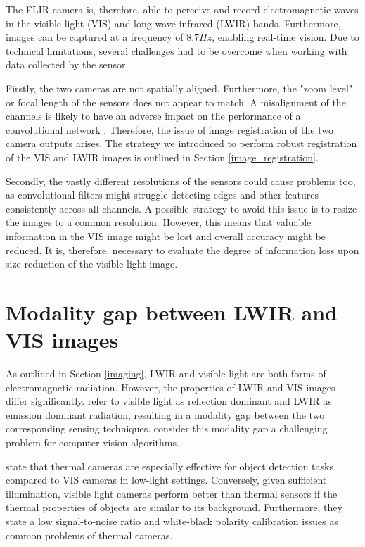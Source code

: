 \documentclass{l4proj}
\begin{document}
The FLIR camera is, therefore, able to perceive and record electromagnetic waves in the visible-light (VIS) and long-wave infrared (LWIR) bands. Furthermore, images can be captured at a frequency of $8.7 Hz$, enabling real-time vision. Due to technical limitations, several challenges had to be overcome when working with data collected by the sensor.

Firstly, the two cameras are not spatially aligned. Furthermore, the "zoom level" or focal length of the sensors does not appear to match. A misalignment of the channels is likely to have an adverse impact on the performance of a convolutional network \citep{chappelow_improving_2008}. Therefore, the issue of image registration of the two camera outputs arises. The strategy we introduced to perform robust registration of the VIS and LWIR images is outlined in Section \ref{image_registration}.

Secondly, the vastly different resolutions of the sensors could cause problems too, as convolutional filters might struggle detecting edges and other features consistently across all channels. A possible strategy to avoid this issue is to resize the images to a common resolution. However, this means that valuable information in the VIS image might be lost and overall accuracy might be reduced. It is, therefore, necessary to evaluate the degree of information loss upon size reduction of the visible light image.


\section{Modality gap between LWIR and VIS images}
\label{modality}

As outlined in Section \ref{imaging}, LWIR and visible light are both forms of electromagnetic radiation. However, the properties of LWIR and VIS images differ significantly. \citet{sarfraz_deep_2017} refer to visible light as reflection dominant and LWIR as emission dominant radiation, resulting in a modality gap between the two corresponding sensing techniques. \citet{choi_thermal_2012} consider this modality gap a challenging problem for computer vision algorithms.

\citet{davis_background-subtraction_2007} state that thermal cameras are especially effective for object detection tasks compared to VIS cameras in low-light settings. Conversely, given sufficient illumination, visible light cameras perform better than thermal sensors if the thermal properties of objects are similar to its background. Furthermore, they state a low signal-to-noise ratio and white-black polarity calibration issues as common problems of thermal cameras.
\end{document}
